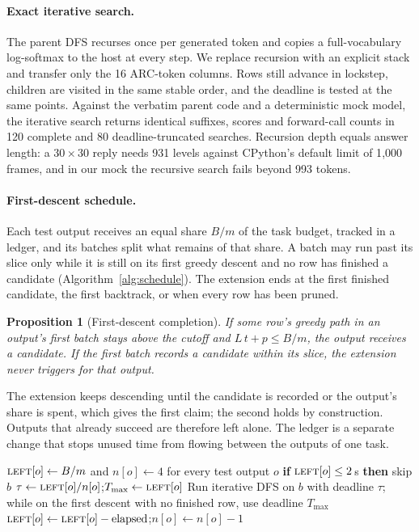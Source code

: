 \documentclass[10pt,twocolumn]{article}
\theoremstyle{plain}\newtheorem{proposition}{Proposition}
\theoremstyle{definition}\newtheorem{corollary}{Corollary}
\begin{document}
\paragraph{Exact iterative search.} The parent DFS recurses once per generated token and copies a full-vocabulary log-softmax to the host at every step. We replace recursion with an explicit stack and transfer only the 16 ARC-token columns. Rows still advance in lockstep, children are visited in the same stable order, and the deadline is tested at the same points. Against the verbatim parent code and a deterministic mock model, the iterative search returns identical suffixes, scores and forward-call counts in 120 complete and 80 deadline-truncated searches. Recursion depth equals answer length: a $30\times30$ reply needs 931 levels against CPython's default limit of 1{,}000 frames, and in our mock the recursive search fails beyond 993 tokens.

\paragraph{First-descent schedule.} Each test output receives an equal share $B/m$ of the task budget, tracked in a ledger, and its batches split what remains of that share. A batch may run past its slice only while it is still on its first greedy descent and no row has finished a candidate (Algorithm~\ref{alg:schedule}). The extension ends at the first finished candidate, the first backtrack, or when every row has been pruned.
\begin{proposition}[First-descent completion]\label{prop:ext}
If some row's greedy path in an output's first batch stays above the cutoff and $L\,t+p\le B/m$, the output receives a candidate. If the first batch records a candidate within its slice, the extension never triggers for that output.
\end{proposition}
\noindent The extension keeps descending until the candidate is recorded or the output's share is spent, which gives the first claim; the second holds by construction. Outputs that already succeed are therefore left alone. The ledger is a separate change that stops unused time from flowing between the outputs of one task.

\begin{algorithm}[t]
\caption{Length-aware view schedule for one task}\label{alg:schedule}
\small
\begin{algorithmic}[1]
\State $\textsc{left}[o]\gets B/m$ and $n[o]\gets 4$ for every test output $o$
  \State \textbf{if} $\textsc{left}[o]\le 2$\,s \textbf{then} skip $b$
  \State $\tau\gets\textsc{left}[o]/n[o]$;\quad $T_{\max}\gets\textsc{left}[o]$
  \State Run iterative DFS on $b$ with deadline $\tau$; while on the first descent with no finished row, use deadline $T_{\max}$
  \State $\textsc{left}[o]\gets\textsc{left}[o]-\text{elapsed}$;\quad $n[o]\gets n[o]-1$
\EndFor
\end{algorithmic}
\end{algorithm}
\end{document}
